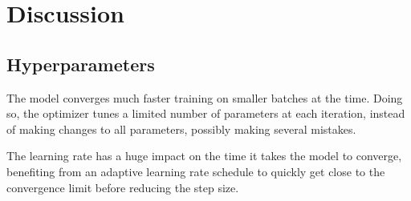 \chapter{Discussion}\label{ch:Discussion}

\section{Hyperparameters}

The model converges much faster training on smaller batches at the time. Doing so, the optimizer tunes a limited number of parameters at each iteration, instead of making changes to all parameters, possibly making several mistakes.

The learning rate has a huge impact on the time it takes the model to converge, benefiting from an adaptive learning rate schedule to quickly get close to the convergence limit before reducing the step size.